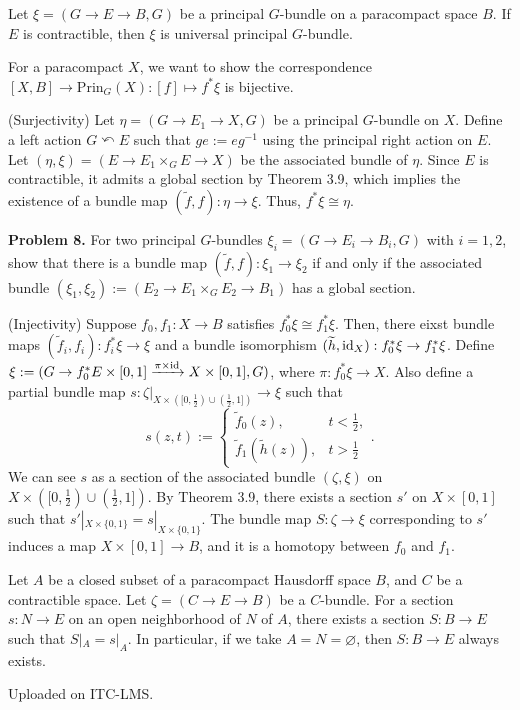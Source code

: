 \documentclass{../../small}
\begin{document}
\begin{thm*}[3.8]
Let $\xi=(G\to E\to B,G)$ be a principal $G$-bundle on a paracompact space $B$.
If $E$ is contractible, then $\xi$ is universal principal $G$-bundle.
\end{thm*}
\begin{pf}
For a paracompact $X$, we want to show the correspondence $[X,B]\to\mathrm{Prin}_G(X):[f]\mapsto f^*\xi$ is bijective.

(Surjectivity)
Let $\eta=(G\to E_1\to X,G)$ be a principal $G$-bundle on $X$.
Define a left action $G\curvearrowleft E$ such that $ge:=eg^{-1}$ using the principal right action on $E$.
Let $(\eta,\xi)=(E\to E_1\times_G E\to X)$ be the associated bundle of $\eta$.
Since $E$ is contractible, it admits a global section by Theorem 3.9, which implies the existence of a bundle map $(\tilde f,f):\eta\to\xi$.
Thus, $f^*\xi\cong\eta$.

\noindent\textbf{Problem 8.} For two principal $G$-bundles $\xi_i=(G\to E_i\to B_i,G)$ with $i=1,2$, show that there is a bundle map $(\tilde f,f):\xi_1\to\xi_2$ if and only if the associated bundle $(\xi_1,\xi_2):=(E_2\to E_1\times_G E_2\to B_1)$ has a global section.

(Injectivity)
Suppose $f_0,f_1:X\to B$ satisfies $f_0^*\xi\cong f_1^*\xi$.
Then, there eixst bundle maps $(\tilde f_i,f_i):f_i^*\xi\to\xi$ and a bundle isomorphism $(\widetilde h,\operatorname{id}_X):f_0^*\xi\to f_1^*\xi$.
Define $\xi:=(G\to f_0^*E\times[0,1]\xrightarrow{\pi\times\operatorname{id}}X\times[0,1],G)$, where $\pi:f_0^*\xi\to X$.
Also define a partial bundle map $s:\zeta|_{X\times([0,\frac12)\cup(\frac12,1])}\to\xi$ such that
\[s(z,t):=\begin{cases}
\tilde f_0(z),&t<\frac12,\\
\tilde f_1(\tilde h(z)),& t>\frac12
\end{cases}.\]
We can see $s$ as a section of the associated bundle $(\zeta,\xi)$ on $X\times([0,\frac12)\cup(\frac12,1])$.
By Theorem 3.9, there exists a section $s'$ on $X\times[0,1]$ such that $s'|_{X\times\{0,1\}}=s|_{X\times\{0,1\}}$.
The bundle map $S:\zeta\to\xi$ corresponding to $s'$ induces a map $X\times [0,1]\to B$, and it is a homotopy between $f_0$ and $f_1$.
\end{pf}

\begin{thm*}[3.9]
Let $A$ be a closed subset of a paracompact Hausdorff space $B$, and $C$ be a contractible space.
Let $\zeta=(C\to E\to B)$ be a $C$-bundle.
For a section $s:N\to E$ on an open neighborhood of $N$ of $A$, there exists a section $S:B\to E$ such that $S|_A=s|_A$.
In particular, if we take $A=N=\varnothing$, then $S:B\to E$ always exists.
\end{thm*}
\begin{pf}
Uploaded on ITC-LMS.
\end{pf}
\end{document}
